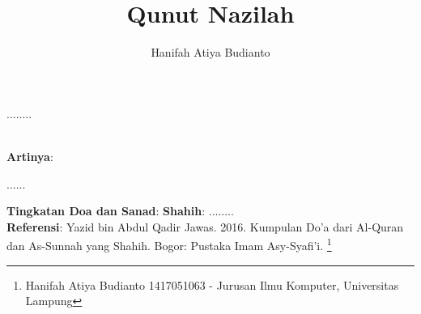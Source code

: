 \documentclass[a4paper,12pt]{article}
\title{\Large Qunut Nazilah}
\author{\calligra Hanifah Atiya Budianto}
\begin{document}
\sffamily
\maketitle 
\fullvocalize
{}
\begin{arabtext}
\noindent
........ \\ \\
\end{arabtext}
\noindent
\textbf{Artinya}:
\par
\indent
...... \\
\par
\noindent
\textbf{Tingkatan Doa dan Sanad}: \textbf{Shahih}: ........\\
\textbf{Referensi}: Yazid bin Abdul Qadir Jawas. 2016. Kumpulan Do'a dari
Al-Quran dan As-Sunnah yang Shahih. Bogor: Pustaka Imam Asy-Syafi'i.
\footnote{Hanifah Atiya Budianto 1417051063 - Jurusan Ilmu Komputer,
Universitas Lampung}
\end{document}
